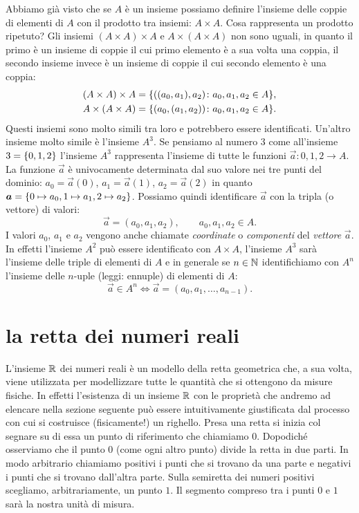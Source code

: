 Abbiamo già visto che se $A$ è un insieme possiamo definire l'insieme 
delle coppie di elementi di $A$ con il prodotto tra insiemi: $A\times A$. 
Cosa rappresenta un prodotto ripetuto?
Gli insiemi $(A\times A)\times A$ e $A\times(A\times A)$ non sono 
uguali, in quanto il primo è un insieme di coppie il cui primo elemento 
è a sua volta una coppia, il secondo insieme invece è un insieme di coppie 
il cui secondo elemento è una coppia:
\begin{gather*}
  (A\times A)\times A = {\left\{ ((a_0,a_1),a_2)\colon a_0,a_1,a_2\in A \right\}},
  \\
  A \times (A\times A) = {\left\{ (a_0,(a_1,a_2))\colon a_0,a_1,a_2\in A \right\}}.
\end{gather*}
Questi insiemi sono molto simili tra loro e potrebbero essere identificati.
Un'altro insieme molto simile è l'insieme $A^3$.  
Se pensiamo al numero $3$ come all'insieme $3 = {\left\{ 0,1,2 \right\}}$ l'insieme 
$A^3$ rappresenta l'insieme di tutte le funzioni $\vec a\colon {0,1,2}\to A$.
La funzione $\vec a$ è univocamente determinata dal suo valore nei 
tre punti del dominio: $a_0 = \vec a(0)$, $a_1=\vec a(1)$, $a_2=\vec a(2)$
in quanto $\boldsymbol a = {\left\{ 0\mapsto a_0, 1\mapsto a_1, 2\mapsto a_2 \right\}}$.
Possiamo quindi identificare $\vec a$ con la tripla (o vettore) di valori:
\[
  \vec a = (a_0, a_1, a_2), \qquad a_0,a_1,a_2 \in A.  
\]
I valori $a_0$, $a_1$ e $a_2$ vengono anche chiamate \emph{coordinate}
o \emph{componenti} del \emph{vettore} $\vec a$.
%
%
%
%
In effetti l'insieme $A^2$ può essere identificato con $A\times A$, l'insieme 
$A^3$ sarà l'insieme delle triple di elementi di $A$ e in generale se $n\in\mathbb N$ 
identifichiamo con $A^n$ l'insieme delle $n$-uple (leggi: ennuple) di elementi 
%
di $A$:
\[
   \vec a \in A^n \iff 
   \vec a = (a_0, a_1, \dots, a_{n-1}).  
\]  


\section{la retta dei numeri reali}
\label{sec:reali}

L'insieme $\mathbb R$ dei numeri reali è un modello della retta geometrica che,
a sua volta, viene utilizzata per modellizzare tutte le quantità che si ottengono
da misure fisiche.
In effetti l'esistenza di un insieme $\mathbb R$ con le proprietà
che andremo ad elencare nella sezione seguente
può essere intuitivamente giustificata dal processo con cui
si costruisce (fisicamente!) un righello. Presa una retta si inizia col segnare
su di essa un punto di riferimento che chiamiamo $0$. Dopodiché osserviamo che
il punto $0$ (come ogni altro punto) divide la retta in due parti. In modo arbitrario
chiamiamo positivi i punti che si trovano da una parte e negativi i punti che
si trovano dall'altra parte. Sulla semiretta dei numeri positivi scegliamo, arbitrariamente,
un punto $1$. Il segmento compreso tra i punti $0$ e $1$ sarà la nostra unità di
misura.

